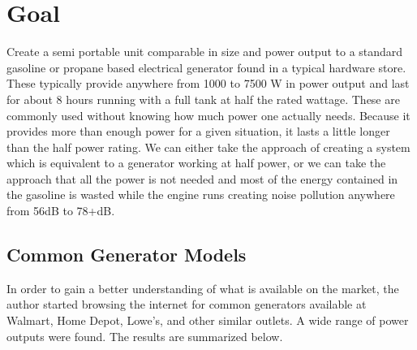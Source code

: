 \documentclass[
10pt, %
letterpaper, %
oneside, %
headinclude,footinclude, %
BCOR5mm, %
]{scrartcl}
\begin{document}
\setcounter{tocdepth}{3} %

\tableofcontents %

\listoffigures %

\listoftables %



\newpage %


\section{Goal}

Create a semi portable unit comparable in size and power output to a standard gasoline or propane based electrical generator found in a typical hardware store. These typically provide anywhere from 1000 to 7500 W in power output and last for about 8 hours running with a full tank at half the rated wattage. These are commonly used without knowing how much power one actually needs. Because it provides more than enough power for a given situation, it lasts a little longer than the half power rating. We can either take the approach of creating a system which is equivalent to a generator working at half power, or we can take the approach that all the power is not needed and most of the energy contained in the gasoline is wasted while the engine runs creating noise pollution anywhere from 56dB to 78+dB.

\subsection{Common Generator Models}

In order to gain a better understanding of what is available on the market, the author started browsing the internet for common generators available at Walmart, Home Depot, Lowe's, and other similar outlets. A wide range of power outputs were found. The results are summarized below.
\end{document}
